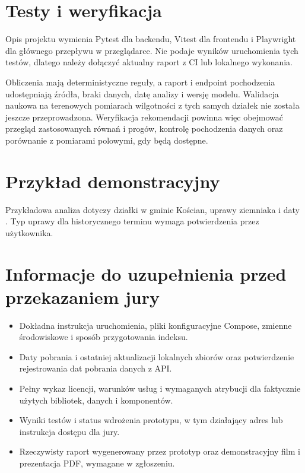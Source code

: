 \documentclass[11pt,a4paper]{article}
\newcommand{\code}[1]{\textcolor{PWField}{\texttt{\detokenize{#1}}}}
\begin{document}
\section{Testy i weryfikacja}

Opis projektu wymienia Pytest dla backendu, Vitest dla frontendu i Playwright dla głównego przepływu w przeglądarce. Nie podaje wyników uruchomienia tych testów, dlatego należy dołączyć aktualny raport z CI lub lokalnego wykonania.

Obliczenia mają deterministyczne reguły, a raport i endpoint pochodzenia udostępniają źródła, braki danych, datę analizy i wersję modelu. Walidacja naukowa na terenowych pomiarach wilgotności z tych samych działek nie została jeszcze przeprowadzona. Weryfikacja rekomendacji powinna więc obejmować przegląd zastosowanych równań i progów, kontrolę pochodzenia danych oraz porównanie z pomiarami polowymi, gdy będą dostępne.

\section{Przykład demonstracyjny}

Przykładowa analiza dotyczy działki \code{301103_2.0009.549/7} w gminie Kościan, uprawy ziemniaka i daty \code{2024-07-05}. Typ uprawy dla historycznego terminu wymaga potwierdzenia przez użytkownika.

\section{Informacje do uzupełnienia przed przekazaniem jury}

\begin{itemize}
  \item Dokładna instrukcja uruchomienia, pliki konfiguracyjne Compose, zmienne środowiskowe i sposób przygotowania indeksu.
  \item Daty pobrania i ostatniej aktualizacji lokalnych zbiorów oraz potwierdzenie rejestrowania dat pobrania danych z API.
  \item Pełny wykaz licencji, warunków usług i wymaganych atrybucji dla faktycznie użytych bibliotek, danych i komponentów.
  \item Wyniki testów i status wdrożenia prototypu, w tym działający adres lub instrukcja dostępu dla jury.
  \item Rzeczywisty raport wygenerowany przez prototyp oraz demonstracyjny film i prezentacja PDF, wymagane w zgłoszeniu.
\end{itemize}
\end{document}
